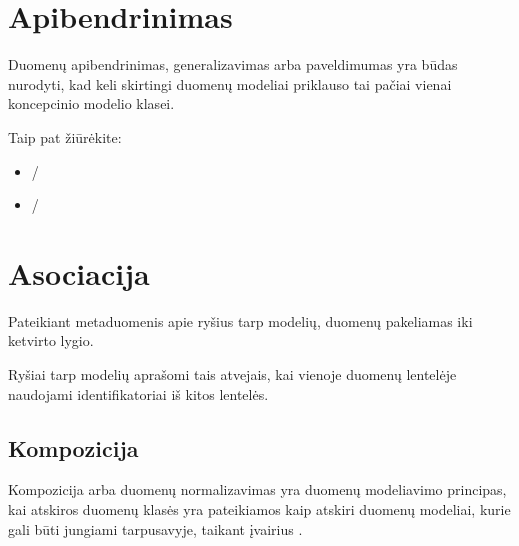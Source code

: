 \documentclass[letterpaper,10pt,lithuanian]{sphinxmanual}
\begin{document}
\sphinxstepscope


\section{Apibendrinimas}
\label{\detokenize{apibendrinimas:apibendrinimas}}\label{\detokenize{apibendrinimas:generalization}}\label{\detokenize{apibendrinimas::doc}}
\sphinxAtStartPar
Duomenų apibendrinimas, generalizavimas arba paveldimumas yra būdas nurodyti,
kad keli skirtingi duomenų modeliai priklauso tai pačiai vienai koncepcinio
modelio klasei.


\begin{sphinxseealso}{Taip pat žiūrėkite:}
\begin{itemize}
\item {} 
\sphinxAtStartPar
{\hyperref[\detokenize{modelis:uml-index}]{}} / {\hyperref[\detokenize{modelis:uml-generalization}]{}}

\item {} 
\sphinxAtStartPar
{\hyperref[\detokenize{dimensijos:dimensijos}]{}} / {\hyperref[\detokenize{dimensijos:base}]{}}

\end{itemize}


\end{sphinxseealso}


\sphinxstepscope


\section{Asociacija}
\label{\detokenize{identifikatoriai:asociacija}}\label{\detokenize{identifikatoriai:rysiai}}\label{\detokenize{identifikatoriai::doc}}
\sphinxAtStartPar
Pateikiant metaduomenis apie ryšius tarp modelių, duomenų {\hyperref[\detokenize{branda:level}]{}} pakeliamas iki ketvirto lygio.

\sphinxAtStartPar
Ryšiai tarp modelių aprašomi tais atvejais, kai vienoje duomenų lentelėje
naudojami identifikatoriai iš kitos lentelės.


\subsection{Kompozicija}
\label{\detokenize{identifikatoriai:kompozicija}}\label{\detokenize{identifikatoriai:composition}}
\sphinxAtStartPar
Kompozicija arba duomenų normalizavimas yra duomenų modeliavimo principas, kai
atskiros duomenų klasės yra pateikiamos kaip atskiri duomenų modeliai, kurie
gali būti jungiami tarpusavyje, taikant įvairius {\hyperref[\detokenize{identifikatoriai:ref-types}]{}}.
\end{document}
